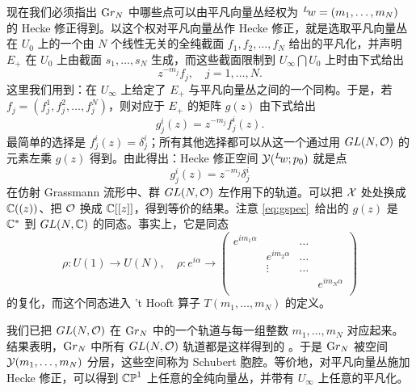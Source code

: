 现在我们必须指出 ${\rm Gr}_N$ 中哪些点可以由平凡向量丛经权为 $^L\negthinspace w=(m_1,\ldots,m_N)$ 的 Hecke 修正得到。以这个权对平凡向量丛作 Hecke 修正，就是选取平凡向量丛在 $U_0$ 上的一个由 $N$ 个线性无关的全纯截面 $f_1,f_2,\dots,f_N$ 给出的平凡化，并声明 $E_+$ 在 $U_0$ 上由截面 $s_1,\ldots,s_N$ 生成，而这些截面限制到 $U_\infty\bigcap U_0$ 上时由下式给出 %
\setcounter{equation}{28}
\begin{equation}\label{eq:mcop}
z^{-m_j} f_j,\quad j=1,\ldots,N.
\end{equation}
这里我们用到：在 $U_\infty$ 上给定了 $E_+$ 与平凡向量丛之间的一个同构。于是，若 $f_j=(f_j^1,f_j^2,\dots,f_j^N)$，则对应于 $E_+$ 的矩阵 $g(z)$ 由下式给出 %
\setcounter{equation}{29}
\begin{equation}\label{eq:xcoxo}
g^i_j(z)=z^{-m_j}
f^i_j(z).
\end{equation}
最简单的选择是 $f^i_j(z)=\delta^i_j$；所有其他选择都可以从这一个通过用 $GL(N,\cO)$ 的元素左乘 $g(z)$ 得到。由此得出：Hecke 修正空间 ${{\EUY}}({}^L\negthinspace w;p_0)$ 就是点 %
\setcounter{equation}{30}
\begin{equation}\label{eq:gspec}
g^i_j(z)=z^{-m_j}
\delta^i_j
\end{equation}
在仿射 Grassmann 流形中、群 $GL(N,\cO)$ 左作用下的轨道。可以把 ${\cal X}$ 处处换成 $\CC((z))$、把 $\cO$ 换成 $\CC[[z]]$，得到等价的结果。注意 \eqref{eq:gspec}\ 给出的 $g(z)$ 是 $\CC^*$ 到 $GL(N,\CC)$ 的同态。事实上，它是同态 %
\setcounter{equation}{31}
\begin{equation}\label{eq:xxconon}
\rho: U(1)\to U(N),\quad \rho:
e^{i\alpha}\to \left(\begin{matrix}e^{i m_1\alpha} & & \ldots & \\ &
e^{i m_2\alpha} & \ldots &  \\  & \vdots & \ldots & \\ & & &
e^{i m_N\alpha}\\\end{matrix}\right)
\end{equation}
的复化，而这个同态进入 't Hooft 算子 $T(m_1,\ldots,m_N)$ 的定义。

我们已把 $GL(N,\cO)$ 在 ${\rm Gr}_N$ 中的一个轨道与每一组整数 $m_1,\ldots,m_N$ 对应起来。结果表明，${\rm Gr}_N$ 中所有 $GL(N,\cO)$ 轨道都是这样得到的 \cite{ref122} 。于是 ${\rm Gr}_N$ 被空间 ${{\EUY}}(m_1,\ldots,m_N)$ 分层，这些空间称为 Schubert 胞腔。等价地，对平凡向量丛施加 Hecke 修正，可以得到 $\Bbb{CP}^1$ 上任意的全纯向量丛，并带有 $U_\infty$ 上任意的平凡化。

